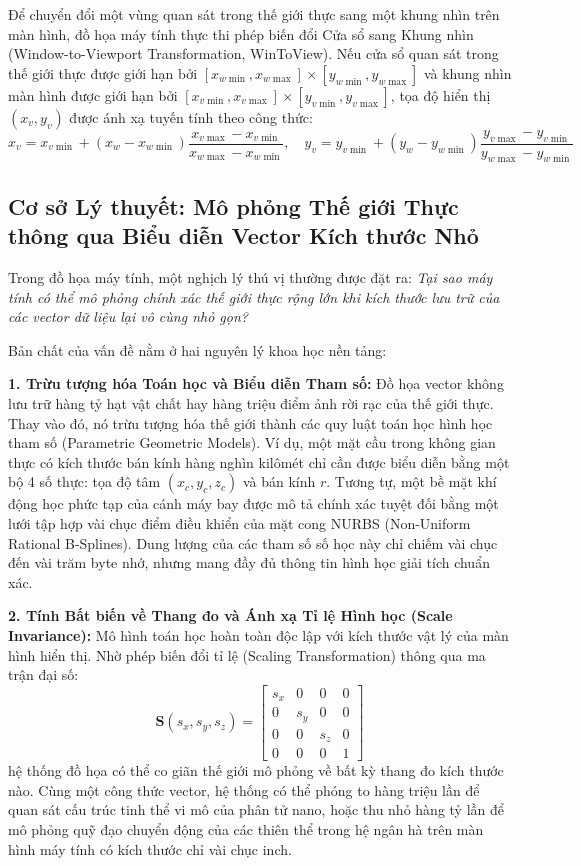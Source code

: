 Để chuyển đổi một vùng quan sát trong thế giới thực sang một khung nhìn trên màn hình, đồ họa máy tính thực thi phép biến đổi Cửa sổ sang Khung nhìn (Window-to-Viewport Transformation, WinToView). Nếu cửa sổ quan sát trong thế giới thực được giới hạn bởi $[x_{w\min}, x_{w\max}] \times [y_{w\min}, y_{w\max}]$ và khung nhìn màn hình được giới hạn bởi $[x_{v\min}, x_{v\max}] \times [y_{v\min}, y_{v\max}]$, tọa độ hiển thị $(x_v, y_v)$ được ánh xạ tuyến tính theo công thức:
\begin{equation}
x_v = x_{v\min} + (x_w - x_{w\min}) \frac{x_{v\max} - x_{v\min}}{x_{w\max} - x_{w\min}}, \quad y_v = y_{v\min} + (y_w - y_{w\min}) \frac{y_{v\max} - y_{v\min}}{y_{w\max} - y_{w\min}}
\end{equation}

\subsection{Cơ sở Lý thuyết: Mô phỏng Thế giới Thực thông qua Biểu diễn Vector Kích thước Nhỏ}

Trong đồ họa máy tính, một nghịch lý thú vị thường được đặt ra: \textit{Tại sao máy tính có thể mô phỏng chính xác thế giới thực rộng lớn khi kích thước lưu trữ của các vector dữ liệu lại vô cùng nhỏ gọn?}

Bản chất của vấn đề nằm ở hai nguyên lý khoa học nền tảng:

\textbf{1. Trừu tượng hóa Toán học và Biểu diễn Tham số:}
Đồ họa vector không lưu trữ hàng tỷ hạt vật chất hay hàng triệu điểm ảnh rời rạc của thế giới thực. Thay vào đó, nó trừu tượng hóa thế giới thành các quy luật toán học hình học tham số (Parametric Geometric Models). Ví dụ, một mặt cầu trong không gian thực có kích thước bán kính hàng nghìn kilômét chỉ cần được biểu diễn bằng một bộ 4 số thực: tọa độ tâm $(x_c, y_c, z_c)$ và bán kính $r$. Tương tự, một bề mặt khí động học phức tạp của cánh máy bay được mô tả chính xác tuyệt đối bằng một lưới tập hợp vài chục điểm điều khiển của mặt cong NURBS (Non-Uniform Rational B-Splines). Dung lượng của các tham số số học này chỉ chiếm vài chục đến vài trăm byte nhớ, nhưng mang đầy đủ thông tin hình học giải tích chuẩn xác.

\textbf{2. Tính Bất biến về Thang đo và Ánh xạ Tỉ lệ Hình học (Scale Invariance):}
Mô hình toán học hoàn toàn độc lập với kích thước vật lý của màn hình hiển thị. Nhờ phép biến đổi tỉ lệ (Scaling Transformation) thông qua ma trận đại số:
\begin{equation}
\mathbf{S}(s_x, s_y, s_z) = \begin{bmatrix} s_x & 0 & 0 & 0 \\ 0 & s_y & 0 & 0 \\ 0 & 0 & s_z & 0 \\ 0 & 0 & 0 & 1 \end{bmatrix}
\end{equation}
hệ thống đồ họa có thể co giãn thế giới mô phỏng về bất kỳ thang đo kích thước nào. Cùng một công thức vector, hệ thống có thể phóng to hàng triệu lần để quan sát cấu trúc tinh thể vi mô của phân tử nano, hoặc thu nhỏ hàng tỷ lần để mô phỏng quỹ đạo chuyển động của các thiên thể trong hệ ngân hà trên màn hình máy tính có kích thước chỉ vài chục inch.

